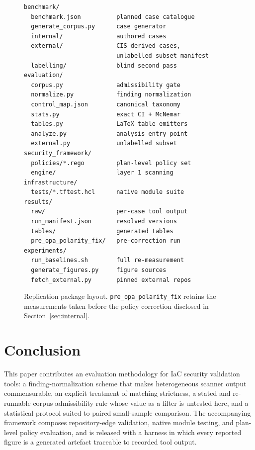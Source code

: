 \documentclass[smallextended]{svjour3}
\begin{document}
\begin{figure}[!t]
\centering
\footnotesize
\begin{verbatim}
benchmark/
  benchmark.json          planned case catalogue
  generate_corpus.py      case generator
  internal/               authored cases
  external/               CIS-derived cases,
                          unlabelled subset manifest
  labelling/              blind second pass
evaluation/
  corpus.py               admissibility gate
  normalize.py            finding normalization
  control_map.json        canonical taxonomy
  stats.py                exact CI + McNemar
  tables.py               LaTeX table emitters
  analyze.py              analysis entry point
  external.py             unlabelled subset
security_framework/
  policies/*.rego         plan-level policy set
  engine/                 layer 1 scanning
infrastructure/
  tests/*.tftest.hcl      native module suite
results/
  raw/                    per-case tool output
  run_manifest.json       resolved versions
  tables/                 generated tables
  pre_opa_polarity_fix/   pre-correction run
experiments/
  run_baselines.sh        full re-measurement
  generate_figures.py     figure sources
  fetch_external.py       pinned external repos
\end{verbatim}
\caption{Replication package layout. \texttt{pre\_opa\_polarity\_fix} retains the
measurements taken before the policy correction disclosed in
Section~\ref{sec:internal}.}
\label{fig:artifact}
\end{figure}

\section{Conclusion}
\label{sec:conclusion}

This paper contributes an evaluation methodology for IaC security validation
tools: a finding-normalization scheme that makes heterogeneous scanner output
commensurable, an explicit treatment of matching strictness, a stated and
re-runnable corpus admissibility rule whose value as a filter is untested here,
and a statistical protocol suited to
paired small-sample comparison. The accompanying framework composes
repository-edge validation, native module testing, and plan-level policy
evaluation, and is released with a harness in which every reported figure is a
generated artefact traceable to recorded tool output.
\end{document}
